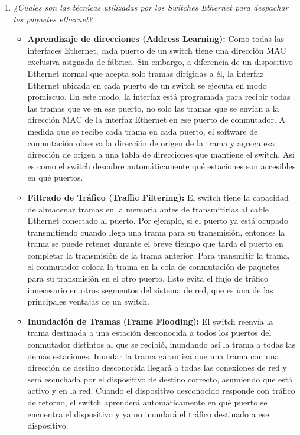 \begin{enumerate}
\item {\color{red}\textit{¿Cuales son las técnicas utilizadas por los Switches Ethernet para despachar los paquetes ethernet?}}

\begin{itemize}
\item \textbf{Aprendizaje de direcciones (Address Learning):} Como todas las interfaces Ethernet, cada puerto de un switch tiene una dirección MAC exclusiva asignada de fábrica. Sin embargo, a diferencia de un dispositivo Ethernet normal que acepta solo tramas dirigidas a él, la interfaz Ethernet ubicada en cada puerto de un switch se ejecuta en modo promiscuo. En este modo, la interfaz está programada para recibir todas las tramas que ve en ese puerto, no solo las tramas que se envían a la dirección MAC de la interfaz Ethernet en ese puerto de conmutador. A medida que se recibe cada trama en cada puerto, el software de conmutación observa la dirección de origen de la trama y agrega esa dirección de origen a una tabla de direcciones que mantiene el switch. Así es como el switch descubre automáticamente qué estaciones son accesibles en qué puertos.
\item \textbf{Filtrado de Tráfico (Traffic Filtering):} El switch tiene la capacidad de almacenar tramas en la memoria antes de transmitirlas al cable Ethernet conectado al puerto. Por ejemplo, si el puerto ya está ocupado transmitiendo cuando llega una trama para su transmisión, entonces la trama se puede retener durante el breve tiempo que tarda el puerto en completar la transmisión de la trama anterior. Para transmitir la trama, el conmutador coloca la trama en la cola de conmutación de paquetes para su transmisión en el otro puerto. Esto evita el flujo de tráfico innecesario en otros segmentos del sistema de red, que es una de las principales ventajas de un switch.
\item \textbf{Inundación de Tramas (Frame Flooding):} El switch reenvía la trama destinada a una estación desconocida a todos los puertos del conmutador distintos al que se recibió, inundando así la trama a todas las demás estaciones. Inundar la trama garantiza que una trama con una dirección de destino desconocida llegará a todas las conexiones de red y será escuchada por el dispositivo de destino correcto, asumiendo que está activo y en la red. Cuando el dispositivo desconocido responde con tráfico de retorno, el switch aprenderá automáticamente en qué puerto se encuentra el dispositivo y ya no inundará el tráfico destinado a ese dispositivo.
\end{itemize}


\end{enumerate}
